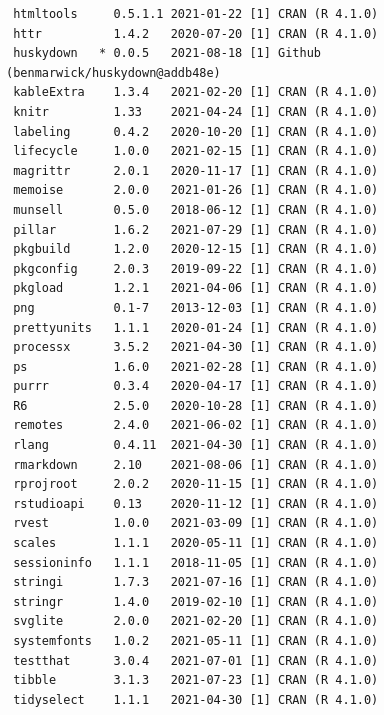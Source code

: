 \documentclass [11pt, proquest] {uwthesis}[2015/03/03]
\begin{document}
\begin{verbatim}
 htmltools     0.5.1.1 2021-01-22 [1] CRAN (R 4.1.0)                       
 httr          1.4.2   2020-07-20 [1] CRAN (R 4.1.0)                       
 huskydown   * 0.0.5   2021-08-18 [1] Github (benmarwick/huskydown@addb48e)
 kableExtra    1.3.4   2021-02-20 [1] CRAN (R 4.1.0)                       
 knitr         1.33    2021-04-24 [1] CRAN (R 4.1.0)                       
 labeling      0.4.2   2020-10-20 [1] CRAN (R 4.1.0)                       
 lifecycle     1.0.0   2021-02-15 [1] CRAN (R 4.1.0)                       
 magrittr      2.0.1   2020-11-17 [1] CRAN (R 4.1.0)                       
 memoise       2.0.0   2021-01-26 [1] CRAN (R 4.1.0)                       
 munsell       0.5.0   2018-06-12 [1] CRAN (R 4.1.0)                       
 pillar        1.6.2   2021-07-29 [1] CRAN (R 4.1.0)                       
 pkgbuild      1.2.0   2020-12-15 [1] CRAN (R 4.1.0)                       
 pkgconfig     2.0.3   2019-09-22 [1] CRAN (R 4.1.0)                       
 pkgload       1.2.1   2021-04-06 [1] CRAN (R 4.1.0)                       
 png           0.1-7   2013-12-03 [1] CRAN (R 4.1.0)                       
 prettyunits   1.1.1   2020-01-24 [1] CRAN (R 4.1.0)                       
 processx      3.5.2   2021-04-30 [1] CRAN (R 4.1.0)                       
 ps            1.6.0   2021-02-28 [1] CRAN (R 4.1.0)                       
 purrr         0.3.4   2020-04-17 [1] CRAN (R 4.1.0)                       
 R6            2.5.0   2020-10-28 [1] CRAN (R 4.1.0)                       
 remotes       2.4.0   2021-06-02 [1] CRAN (R 4.1.0)                       
 rlang         0.4.11  2021-04-30 [1] CRAN (R 4.1.0)                       
 rmarkdown     2.10    2021-08-06 [1] CRAN (R 4.1.0)                       
 rprojroot     2.0.2   2020-11-15 [1] CRAN (R 4.1.0)                       
 rstudioapi    0.13    2020-11-12 [1] CRAN (R 4.1.0)                       
 rvest         1.0.0   2021-03-09 [1] CRAN (R 4.1.0)                       
 scales        1.1.1   2020-05-11 [1] CRAN (R 4.1.0)                       
 sessioninfo   1.1.1   2018-11-05 [1] CRAN (R 4.1.0)                       
 stringi       1.7.3   2021-07-16 [1] CRAN (R 4.1.0)                       
 stringr       1.4.0   2019-02-10 [1] CRAN (R 4.1.0)                       
 svglite       2.0.0   2021-02-20 [1] CRAN (R 4.1.0)                       
 systemfonts   1.0.2   2021-05-11 [1] CRAN (R 4.1.0)                       
 testthat      3.0.4   2021-07-01 [1] CRAN (R 4.1.0)                       
 tibble        3.1.3   2021-07-23 [1] CRAN (R 4.1.0)                       
 tidyselect    1.1.1   2021-04-30 [1] CRAN (R 4.1.0)                       

\end{verbatim}
\end{document}
